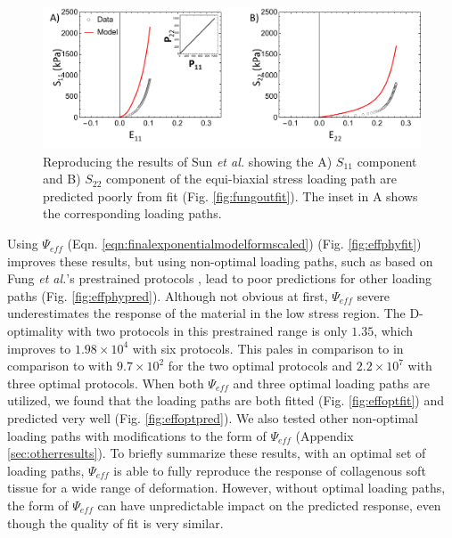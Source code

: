\begin{figure}[hptb]
\centering
\includegraphics[width=\textwidth]{Images/chapter5/fungoutpred}
\caption{Reproducing the results of Sun \textit{et al.} \cite{sun_biaxial_2003} showing the A) $S_{11}$ component and B) $S_{22}$ component of the equi-biaxial stress loading path are predicted poorly from fit (Fig. \ref{fig:fungoutfit}). The inset in A shows the corresponding loading paths.}
\label{fig:fungoutpred}
\end{figure} 
    

	Using $\Psi_{eff}$ (Eqn. \ref{eqn:finalexponentialmodelformscaled}) (Fig. \ref{fig:effphyfit}) improves these results, but using non-optimal loading paths, such as based on Fung \textit{et al.}'s prestrained protocols \cite{fung_pseudoelasticity_1979}, lead to poor predictions for other loading paths (Fig. \ref{fig:effphypred}). Although not obvious at first, $\Psi_{eff}$ severe underestimates the response of the material in the low stress region. The D-optimality with two protocols in this prestrained range is only $1.35$, which improves to $1.98\times 10^4$ with six protocols. This pales in comparison to in comparison to with $9.7 \times 10^2$ for the two optimal protocols and $2.2 \times 10^7$ with three optimal protocols. When both $\Psi_{eff}$ and three optimal loading paths are utilized, we found that the loading paths are both fitted (Fig. \ref{fig:effoptfit}) and predicted very well (Fig. \ref{fig:effoptpred}). We also tested other non-optimal loading paths with modifications to the form of $\Psi_{eff}$ (Appendix \ref{sec:otherresults}). To briefly summarize these results, with an optimal set of loading paths, $\Psi_{eff}$ is able to fully reproduce the response of collagenous soft tissue for a wide range of deformation. However, without optimal loading paths, the form of $\Psi_{eff}$ can have unpredictable impact on the predicted response, even though the quality of fit is very similar. 



